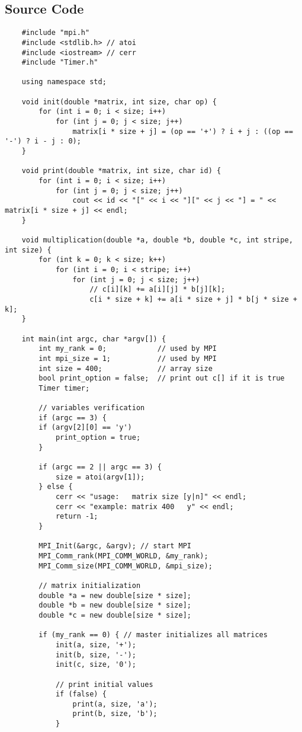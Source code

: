 \documentclass[11pt, letterpaper]{article}
\begin{document}
	\subsection{Source Code}
	\vspace{-0.2in}
	\begin{lstlisting}
	#include "mpi.h"
	#include <stdlib.h> // atoi
	#include <iostream> // cerr
	#include "Timer.h"
	
	using namespace std;
	
	void init(double *matrix, int size, char op) {
		for (int i = 0; i < size; i++)
			for (int j = 0; j < size; j++)
				matrix[i * size + j] = (op == '+') ? i + j : ((op == '-') ? i - j : 0);
	}
	
	void print(double *matrix, int size, char id) {
		for (int i = 0; i < size; i++)
			for (int j = 0; j < size; j++)
				cout << id << "[" << i << "][" << j << "] = " << matrix[i * size + j] << endl;
	}
	
	void multiplication(double *a, double *b, double *c, int stripe, int size) {
		for (int k = 0; k < size; k++)
			for (int i = 0; i < stripe; i++)
				for (int j = 0; j < size; j++)
					// c[i][k] += a[i][j] * b[j][k];
					c[i * size + k] += a[i * size + j] * b[j * size + k];
	}
	
	int main(int argc, char *argv[]) {
		int my_rank = 0;            // used by MPI
		int mpi_size = 1;           // used by MPI
		int size = 400;             // array size
		bool print_option = false;  // print out c[] if it is true
		Timer timer;
		
		// variables verification
		if (argc == 3) {
		if (argv[2][0] == 'y')
			print_option = true;
		}
		
		if (argc == 2 || argc == 3) {
			size = atoi(argv[1]);
		} else {
			cerr << "usage:   matrix size [y|n]" << endl;
			cerr << "example: matrix 400   y" << endl;
			return -1;
		}
		
		MPI_Init(&argc, &argv); // start MPI
		MPI_Comm_rank(MPI_COMM_WORLD, &my_rank);
		MPI_Comm_size(MPI_COMM_WORLD, &mpi_size);
		
		// matrix initialization
		double *a = new double[size * size];
		double *b = new double[size * size];
		double *c = new double[size * size];
		
		if (my_rank == 0) { // master initializes all matrices
			init(a, size, '+');
			init(b, size, '-');
			init(c, size, '0');
			
			// print initial values
			if (false) {
				print(a, size, 'a');
				print(b, size, 'b');
			}
		

\end{lstlisting}
\end{document}
